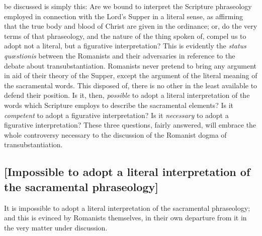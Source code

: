 \documentclass[
  english,
]{book}
\providecommand{\textlatin}{}
\renewcommand{\textlatin}[2][]{\foreignlanguage{latin}{#2}}
\begin{document}
be discussed is simply this: Are we bound to interpret the Scripture phraseology employed in connection with the Lord's Supper in a literal sense, as affirming that the true body and blood of Christ are given in the ordinance; or, do the very terms of that phraseology, and the nature of the thing spoken of, compel us to adopt not a literal, but a figurative interpretation? This is evidently the \textlatin{\emph{status quœstionis}} between the Romanists and their adversaries in reference to the debate about transubstantiation. Romanists never pretend to bring any argument in aid of their theory of the Supper, except the argument of the literal meaning of the sacramental words. This disposed of, there is no other in the least available to defend their position. Is it, then, \emph{possible} to adopt a literal interpretation of the words which Scripture employs to describe the sacramental elements? Is it \emph{competent} to adopt a figurative interpretation? Is it \emph{necessary} to adopt a figurative interpretation? These three questions, fairly answered, will embrace the whole controversy necessary to the discussion of the Romanist dogma of transubstantiation.

\hypertarget{impossible-to-adopt-a-literal-interpretation-of-the-sacramental-phraseology}{%
\subsection{{[}Impossible to adopt a literal interpretation of the sacramental phraseology{]}}\label{impossible-to-adopt-a-literal-interpretation-of-the-sacramental-phraseology}}

It is impossible to adopt a literal interpretation of the sacramental phraseology; and this is evinced by Romanists themselves, in their own departure from it in the very matter under discussion.
\end{document}
